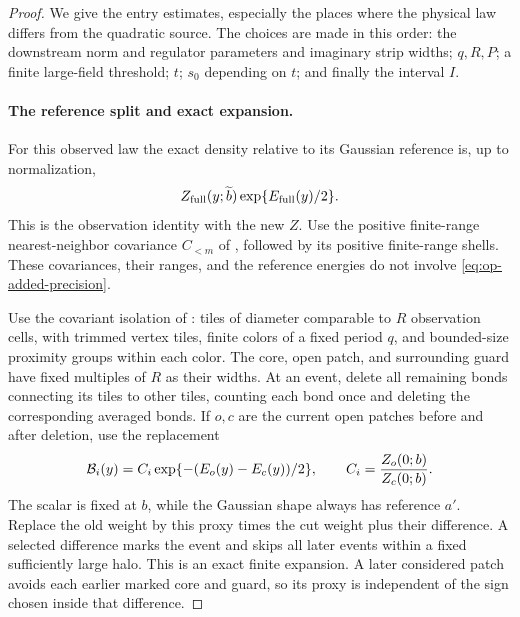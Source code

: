 \begin{proof}
We give the entry estimates, especially the places where the
physical law differs from the quadratic source.
The choices are made in this order: the downstream norm and
regulator parameters and imaginary strip widths; \(q,R,P\);
a finite large-field threshold; \(t\); \(s_0\) depending on
\(t\); and finally the interval \(I\).

\paragraph{The reference split and exact expansion.}
For this observed law the exact density relative to its
Gaussian reference is, up to normalization,
\begin{equation}\label{eq:op-exact-density}
             Z_{\rm full}(y;\widetilde b)
                         \exp\{E_{\rm full}(y)/2\}.
\end{equation}
This is the observation identity 
with the new \(Z\).  Use the positive finite-range
nearest-neighbor covariance \(C_{<m}\) of
, followed by its positive
finite-range shells.  These covariances, their ranges, and
the reference energies do not involve
\eqref{eq:op-added-precision}.

Use the covariant isolation of : tiles of
diameter comparable to \(R\) observation cells, with trimmed
vertex tiles, finite colors of a fixed period \(q\), and
bounded-size proximity groups within each color.  The core,
open patch, and surrounding guard have fixed multiples of
\(R\) as their widths.  At an event, delete all remaining
bonds connecting its tiles to other tiles, counting each
bond once and deleting the corresponding averaged bonds.
If \(o,c\) are the current open patches before and after
deletion, use the replacement
\begin{equation}\label{eq:op-proxy}
 {\cal B}_i(y)=C_i\exp\{-(E_o(y)-E_c(y))/2\},\qquad
       C_i=\frac{Z_o(0;b)}{Z_c(0;b)}.
\end{equation}
The scalar is fixed at \(b\), while the Gaussian shape
always has reference \(a'\).  Replace the old weight by
this proxy times the cut weight plus their difference.
A selected difference marks the event and skips all later
events within a fixed sufficiently large halo.  This is an
exact finite expansion.  A later considered patch avoids
each earlier marked core and guard, so its proxy is
independent of the sign chosen inside that difference.


\end{proof}
